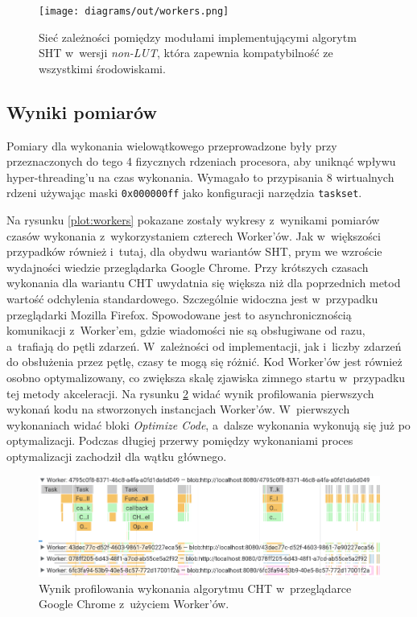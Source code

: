 \begin{figure}[h]
    \centering
    \texttt{[image: diagrams/out/workers.png]}
    \caption{Sieć zależności pomiędzy modułami implementującymi algorytm SHT w~wersji \textit{non-LUT}, która zapewnia kompatybilność ze wszystkimi środowiskami.}
    \label{fig:workers-struct}
\end{figure}

\subsection{Wyniki pomiarów}

Pomiary dla wykonania wielowątkowego przeprowadzone były przy przeznaczonych do tego 4 fizycznych rdzeniach procesora, aby uniknąć wpływu hyper-threading'u na czas wykonania. Wymagało to przypisania 8 wirtualnych rdzeni używając maski \lstinline{0x000000ff} jako konfiguracji narzędzia \lstinline{taskset}.




Na rysunku \ref{plot:workers} pokazane zostały wykresy z~wynikami pomiarów czasów wykonania z~wykorzystaniem czterech Worker'ów. Jak w~większości przypadków również i~tutaj, dla obydwu wariantów SHT, prym we wzroście wydajności wiedzie przeglądarka Google Chrome. Przy krótszych czasach wykonania dla wariantu CHT uwydatnia się większa niż dla poprzednich metod wartość odchylenia standardowego. Szczególnie widoczna jest w~przypadku przeglądarki Mozilla Firefox. Spowodowane jest to asynchronicznością komunikacji z~Worker'em, gdzie wiadomości nie są obsługiwane od razu, a~trafiają do pętli zdarzeń. W~zależności od implementacji, jak i~liczby zdarzeń do obsłużenia przez pętlę, czasy te mogą się różnić. Kod Worker'ów jest również osobno optymalizowany, co zwiększa skalę zjawiska zimnego startu w~przypadku tej metody akceleracji.  Na rysunku \ref{fig:profiler-workers} widać wynik profilowania pierwszych wykonań kodu na stworzonych instancjach Worker'ów. W~pierwszych wykonaniach widać bloki \textit{Optimize Code}, a~dalsze wykonania wykonują się już po optymalizacji. Podczas długiej przerwy pomiędzy wykonaniami proces optymalizacji zachodził dla wątku głównego.

\begin{figure}[h]
    \centering
    \includegraphics[width=\linewidth]{img/workers-profiler.png}
    \caption{Wynik profilowania wykonania algorytmu CHT w~przeglądarce Google Chrome z~użyciem Worker'ów.}
    \label{fig:profiler-workers}
\end{figure}

